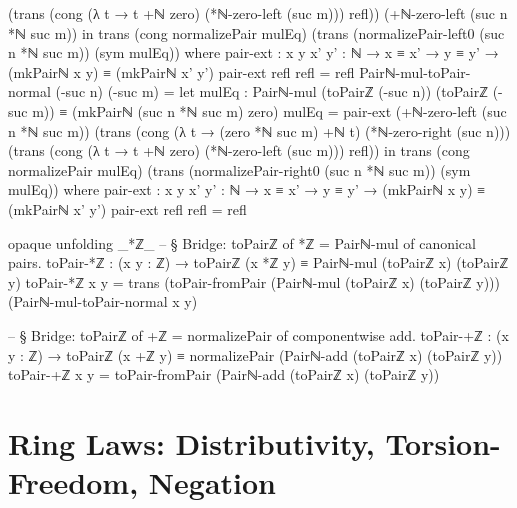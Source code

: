 \documentclass[11pt,a4paper]{book}
\begin{document}
\begin{code}
            (trans
              (cong (λ t → t +ℕ zero) (*ℕ-zero-left (suc m)))
              refl))
          (+ℕ-zero-left (suc n *ℕ suc m))
  in
  trans (cong normalizePair mulEq)
    (trans (normalizePair-left0 (suc n *ℕ suc m)) (sym mulEq))
  where
    pair-ext : {x y x' y' : ℕ} → x ≡ x' → y ≡ y' → (mkPairℕ x y) ≡ (mkPairℕ x' y')
    pair-ext refl refl = refl
Pairℕ-mul-toPair-normal (-suc n) (-suc m) =
  let mulEq : Pairℕ-mul (toPairℤ (-suc n)) (toPairℤ (-suc m)) ≡ (mkPairℕ (suc n *ℕ suc m) zero)
      mulEq =
        pair-ext
          (+ℕ-zero-left (suc n *ℕ suc m))
          (trans
            (cong (λ t → (zero *ℕ suc m) +ℕ t) (*ℕ-zero-right (suc n)))
            (trans
              (cong (λ t → t +ℕ zero) (*ℕ-zero-left (suc m)))
              refl))
  in
  trans (cong normalizePair mulEq)
    (trans (normalizePair-right0 (suc n *ℕ suc m)) (sym mulEq))
  where
    pair-ext : {x y x' y' : ℕ} → x ≡ x' → y ≡ y' → (mkPairℕ x y) ≡ (mkPairℕ x' y')
    pair-ext refl refl = refl

opaque
  unfolding _*ℤ_
  -- § Bridge: toPairℤ of *ℤ = Pairℕ-mul of canonical pairs.
  toPair-*ℤ : (x y : ℤ) → toPairℤ (x *ℤ y) ≡ Pairℕ-mul (toPairℤ x) (toPairℤ y)
  toPair-*ℤ x y =
    trans
      (toPair-fromPair (Pairℕ-mul (toPairℤ x) (toPairℤ y)))
      (Pairℕ-mul-toPair-normal x y)

-- § Bridge: toPairℤ of +ℤ = normalizePair of componentwise add.
toPair-+ℤ : (x y : ℤ) → toPairℤ (x +ℤ y) ≡ normalizePair (Pairℕ-add (toPairℤ x) (toPairℤ y))
toPair-+ℤ x y = toPair-fromPair (Pairℕ-add (toPairℤ x) (toPairℤ y))
\end{code}

\section{Ring Laws: Distributivity, Torsion-Freedom, Negation}
\end{document}
